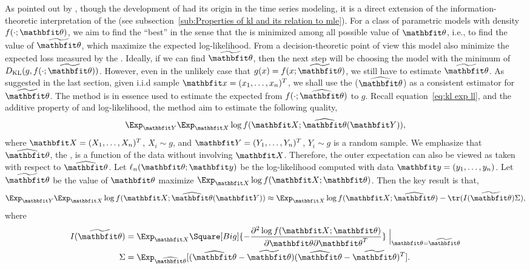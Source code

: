 As pointed out by \textcite{Bozdogan1987}, though the development of \aic had
its origin in the time series modeling, it is a direct extension of the
information-theoretic interpretation of the \mle (see
subsection~\ref{sub:Properties of kl and its relation to mle}). For a class of
parametric models with density $f(\cdot;\bth)$, we aim to find the ``best'' in
the sense that the \kl is minimized among all possible value of $\bth$, i.e.,
to find the value of $\tbth$, which maximize the expected log-likelihood. From
a decision-theoretic point of view this model also minimize the expected loss
measured by the \kl \parencite{Akaike1973}. Ideally, if we can find $\tbth$,
then the next step will be choosing the model with the minimum of
$D_{\mathrm{KL}}(g,f(\cdot;\tbth))$. However, even in the unlikely case that
$g(x) = f(x;\tbth)$, we still have to estimate $\tbth$. As suggested in the
last section, given i.i.d sample $\bfx = (x_1,\dots,x_n)^T$, we shall use the
\mle ($\hbth$) as a consistent estimator for $\tbth$. The \aic method is in
essence used to estimate the expected \kl from $f(\cdot; \hbth)$ to $g$.
Recall equation~\eqref{eq:kl exp ll}, and the additive property of \kl and
log-likelihood, the \aic method aim to estimate the following quality,
\begin{equation}
  \Exp_{\bfY}\Exp_{\bfX}\log f(\bfX;\hbth(\bfY)),
\end{equation}
where $\bfX = (X_1,\dots,X_n)^T$, $X_i \sim g$, and $\bfY =
(Y_1,\dots,Y_n)^T$, $Y_i \sim g$ is a random sample. We emphasize that
$\hbth$, the \mle, is a function of the data without involving $\bfX$.
Therefore, the outer expectation can also be viewed as taken with respect to
$\hbth$. Let $\ell_n(\bth;\bfy)$ be the log-likelihood computed with data
$\bfy = (y_1,\dots,y_n)$. Let $\tbth$ be the value of $\bth$ maximize
$\Exp_{\bfX}\log f(\bfX;\bth)$. Then the key result is that,
\begin{equation}
  \Exp_{\bfY}\Exp_{\bfX}\log f(\bfX;\hbth(\bfY))
  \approx \Exp_{\bfX}\log f(\bfX;\hbth) - \tr(I(\tbth)\Sigma),
  \label{eq:aic general}
\end{equation}
where
\begin{align}
  I(\tbth)
  & = \Exp_{\bfX}\Square[Big]{
    -\frac{\partial^2\log f(\bfX;\bth)}{\partial\bth\partial\bth^T}}
  \Bigm|_{\bth=\tbth} \\
  \Sigma &= \Exp_{\hbth}[(\hbth-\tbth)(\hbth-\tbth)^T].
\end{align}

